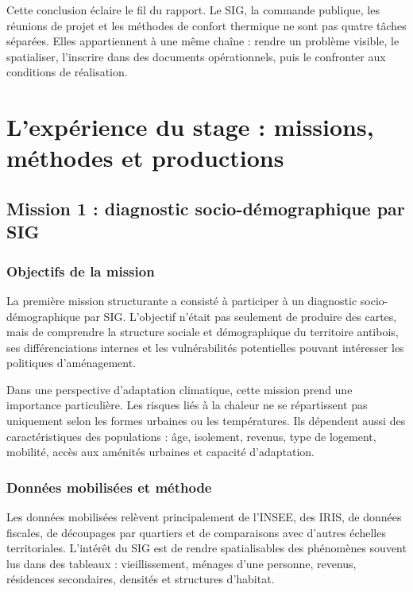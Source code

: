 \documentclass[11pt,a4paper]{report}
\begin{document}
Cette conclusion éclaire le fil du rapport. Le SIG, la commande publique, les réunions de projet et les méthodes de confort thermique ne sont pas quatre tâches séparées. Elles appartiennent à une même chaîne : rendre un problème visible, le spatialiser, l'inscrire dans des documents opérationnels, puis le confronter aux conditions de réalisation.

\chapter{L'expérience du stage : missions, méthodes et productions}

\section{Mission 1 : diagnostic socio-démographique par SIG}

\subsection{Objectifs de la mission}

La première mission structurante a consisté à participer à un diagnostic socio-démographique par SIG. L'objectif n'était pas seulement de produire des cartes, mais de comprendre la structure sociale et démographique du territoire antibois, ses différenciations internes et les vulnérabilités potentielles pouvant intéresser les politiques d'aménagement.

Dans une perspective d'adaptation climatique, cette mission prend une importance particulière. Les risques liés à la chaleur ne se répartissent pas uniquement selon les formes urbaines ou les températures. Ils dépendent aussi des caractéristiques des populations : âge, isolement, revenus, type de logement, mobilité, accès aux aménités urbaines et capacité d'adaptation.

\subsection{Données mobilisées et méthode}

Les données mobilisées relèvent principalement de l'INSEE, des IRIS, de données fiscales, de découpages par quartiers et de comparaisons avec d'autres échelles territoriales. L'intérêt du SIG est de rendre spatialisables des phénomènes souvent lus dans des tableaux : vieillissement, ménages d'une personne, revenus, résidences secondaires, densités et structures d'habitat.
\end{document}
